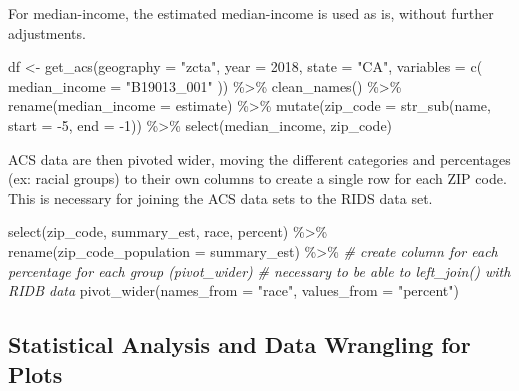 \documentclass[
]{book}
\newenvironment{Shaded}{\begin{snugshade}}{\end{snugshade}}
\newcommand{\AttributeTok}[1]{\textcolor[rgb]{0.77,0.63,0.00}{#1}}
\newcommand{\CommentTok}[1]{\textcolor[rgb]{0.56,0.35,0.01}{\textit{#1}}}
\newcommand{\DecValTok}[1]{\textcolor[rgb]{0.00,0.00,0.81}{#1}}
\newcommand{\FunctionTok}[1]{\textcolor[rgb]{0.00,0.00,0.00}{#1}}
\newcommand{\NormalTok}[1]{#1}
\newcommand{\OtherTok}[1]{\textcolor[rgb]{0.56,0.35,0.01}{#1}}
\newcommand{\SpecialCharTok}[1]{\textcolor[rgb]{0.00,0.00,0.00}{#1}}
\newcommand{\StringTok}[1]{\textcolor[rgb]{0.31,0.60,0.02}{#1}}
\begin{document}
For median-income, the estimated median-income is used as is, without further adjustments.

\begin{Shaded}
\begin{Highlighting}[]
\NormalTok{df }\OtherTok{\textless{}{-}} 
  \FunctionTok{get\_acs}\NormalTok{(}\AttributeTok{geography =} \StringTok{"zcta"}\NormalTok{, }\AttributeTok{year =} \DecValTok{2018}\NormalTok{,}
          \AttributeTok{state =} \StringTok{"CA"}\NormalTok{,}
          \AttributeTok{variables =} \FunctionTok{c}\NormalTok{(}
            \AttributeTok{median\_income =} \StringTok{"B19013\_001"} 
\NormalTok{          )) }\SpecialCharTok{\%\textgreater{}\%} 
  \FunctionTok{clean\_names}\NormalTok{() }\SpecialCharTok{\%\textgreater{}\%} 
  \FunctionTok{rename}\NormalTok{(}\AttributeTok{median\_income =}\NormalTok{ estimate) }\SpecialCharTok{\%\textgreater{}\%} 
  \FunctionTok{mutate}\NormalTok{(}\AttributeTok{zip\_code =} \FunctionTok{str\_sub}\NormalTok{(name, }\AttributeTok{start =} \SpecialCharTok{{-}}\DecValTok{5}\NormalTok{, }\AttributeTok{end =} \SpecialCharTok{{-}}\DecValTok{1}\NormalTok{)) }\SpecialCharTok{\%\textgreater{}\%} 
  \FunctionTok{select}\NormalTok{(median\_income, zip\_code)}
\end{Highlighting}
\end{Shaded}

ACS data are then pivoted wider, moving the different categories and percentages (ex: racial groups) to their own columns to create a single row for each ZIP code. This is necessary for joining the ACS data sets to the RIDS data set.

\begin{Shaded}
\begin{Highlighting}[]
\FunctionTok{select}\NormalTok{(zip\_code, summary\_est, race, percent) }\SpecialCharTok{\%\textgreater{}\%} 
  \FunctionTok{rename}\NormalTok{(}\AttributeTok{zip\_code\_population =}\NormalTok{ summary\_est) }\SpecialCharTok{\%\textgreater{}\%} 
  \CommentTok{\# create column for each percentage for each group (pivot\_wider)}
  \CommentTok{\# necessary to be able to left\_join() with RIDB data}
  \FunctionTok{pivot\_wider}\NormalTok{(}\AttributeTok{names\_from =} \StringTok{"race"}\NormalTok{,}
              \AttributeTok{values\_from =} \StringTok{"percent"}\NormalTok{)}
\end{Highlighting}
\end{Shaded}

\hypertarget{statistical-analysis-and-data-wrangling-for-plots}{%
\subsection{Statistical Analysis and Data Wrangling for Plots}\label{statistical-analysis-and-data-wrangling-for-plots}}
\end{document}
